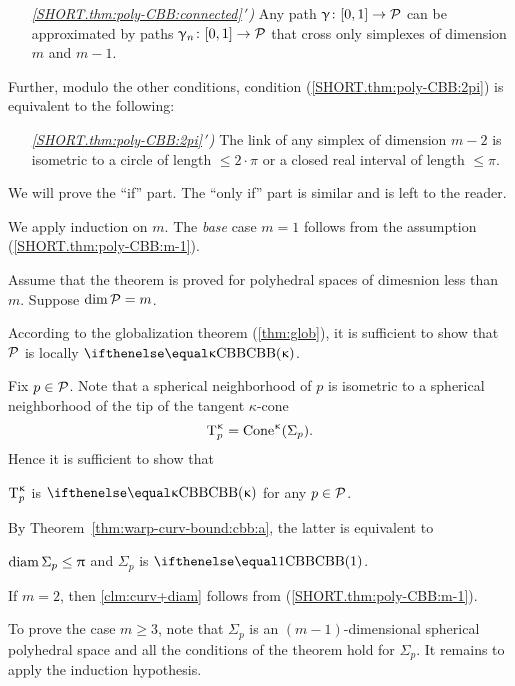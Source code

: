 \begin{itemize}
 \item[{\it \ref{SHORT.thm:poly-CBB:connected}$\,'\!$)}] 
Any path $\gamma\:[0,1]\to \spc{P}$ can be approximated by paths
$\gamma_n\:[0,1]\to \spc{P}$ 
that cross only simplexes of dimension $m$ and $m-1$.
\end{itemize}

Further, modulo the other conditions,
 condition (\ref{SHORT.thm:poly-CBB:2pi})
is equivalent to the following:


\begin{itemize}
 \item[{\it \ref{SHORT.thm:poly-CBB:2pi}$\,'\!$)}] 
The link of any simplex of dimension $m-2$ is 
isometric to a circle of length $\le 2\cdot\pi$
or a closed real interval of length $\le \pi$.
\end{itemize}

We will prove the ``if'' part.
The ``only if'' part is similar and is left to the reader.

We apply induction on $m$.
The {}\emph{base} case $m=1$ follows from the assumption (\ref{SHORT.thm:poly-CBB:m-1}).

Assume that the theorem is proved for polyhedral spaces  of dimesnion less than $m$.
Suppose  $\mathop{\rm dim}\nolimits\mathcal{P}=m$.

According to the globalization theorem (\ref{thm:glob}),
it is sufficient to show that 
$\mathcal{P}$  is locally $\Alex\kappa$. 

Fix $p\in \spc{P}$.
Note that a spherical neighborhood of $p$
is isometric
to a  spherical neighborhood of the tip of the tangent $\kappa$-cone 
$$\T_p\mc\kappa\z
=
\Cone\mc\kappa(\Sigma_p).$$
Hence it is sufficient to show that 
\begin{clm}{}
 $\text{\rm T}_p^{\upkappa}$ is $\Alex\kappa$ for any $p\in \spc{P}$.
\end{clm}

By Theorem~\ref{thm:warp-curv-bound:cbb:a}, 
the latter is equivalent to 
\begin{clm}{}\label{clm:curv+diam}
$\diam\Sigma_p\le \pi$ and $\Sigma_p$ is $\Alex1$.
\end{clm}


If $m=2$, then \ref{clm:curv+diam} follows from (\ref{SHORT.thm:poly-CBB:m-1}).

To prove the case $m\ge 3$,
note that $\Sigma_p$ is an $(m-1)$-dimensional spherical polyhedral space and all the conditions of the theorem hold for $\Sigma_p$.
It remains to apply the induction hypothesis.\qeds

